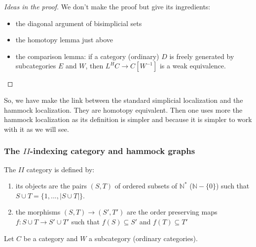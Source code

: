 \begin{refsection}
\begin{proof}[Ideas in the proof]
We don't make the proof but give its ingredients:
\begin{itemize}
\item the diagonal argument of bisimplicial sets
\item the homotopy lemma just above
\item the comparison lemma: if a category (ordinary) $D$ is freely generated by subcategories $E$ and $W$, then $L^H C \rightarrow C[W^{-1}]$ is a weak equivalence.
\end{itemize}
\end{proof}

So, we have make the link between the standard simplicial localization and the hammock localization. They are homotopy equivalent. Then one uses more the hammock localization as its definition is simpler and because it is simpler to work with it as we will see.

\subsubsection{The $II$-indexing category and hammock graphs}

The $II$ category is defined by:
\begin{enumerate}
\item its objects are the pairs $(S,T)$ of ordered subsets of $\mathbb{N}^*$ ($\mathbb{N}-\{0\}$) such that $S \cup T= \{1,...,|S \cup T|\}$.
\item the morphisms $(S,T) \rightarrow (S',T')$ are the order preserving maps $f: S \cup T \rightarrow S' \cup T'$ such that $f(S) \subseteq S'$ and $f(T) \subseteq T'$
\end{enumerate}

Let $C$ be a category and $W$ a subcategory (ordinary categories).


\end{refsection}
